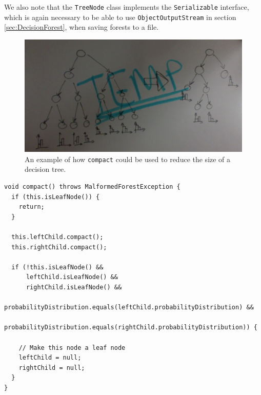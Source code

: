\documentclass[12pt,twoside,notitlepage]{report}
\begin{document}
                We also note that the \texttt{TreeNode} class implements the \texttt{Serializable} interface, 
                which is again necessary to be able to use \texttt{ObjectOutputStream} in section 
                \ref{sec:DecisionForest}, when saving forests to a file.

                \begin{figure}[H]
                  \centering
                  \includegraphics[scale=0.35]{tree_compaction}
                  \caption{An example of how \texttt{compact} could be used to reduce the size of a decision tree.}
                \end{figure}

                \begin{lstlisting}[float=tp,caption={The \texttt{TreeNode} declaration, found as a static class within the 
                \texttt{DecisionForest} class.},label={lst:TreeNode}]
void compact() throws MalformedForestException {
  if (this.isLeafNode()) {
    return;
  }
  
  this.leftChild.compact();
  this.rightChild.compact();

  if (!this.isLeafNode() && 
      leftChild.isLeafNode() &&
      rightChild.isLeafNode() &&
      probabilityDistribution.equals(leftChild.probabilityDistribution) &&
      probabilityDistribution.equals(rightChild.probabilityDistribution)) {
    
    // Make this node a leaf node
    leftChild = null;
    rightChild = null;
  }
}
                \end{lstlisting}
\end{document}
